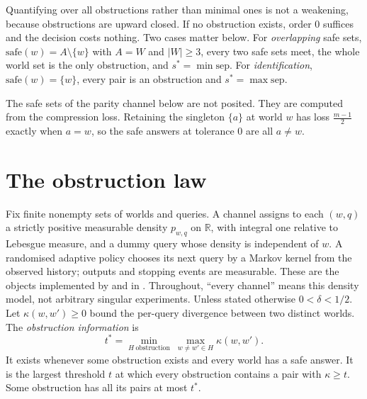 
Quantifying over all obstructions rather than minimal ones is not a weakening, because
obstructions are upward closed. If no obstruction exists, order $0$ suffices and the decision
costs nothing. Two cases matter below. For \emph{overlapping} safe sets,
$\mathrm{safe}(w)=A\setminus\{w\}$ with $A=W$ and $|W|\ge3$, every two safe sets meet, the whole world set is
the only obstruction, and $s^{*}=\min\mathrm{sep}$. For \emph{identification},
$\mathrm{safe}(w)=\{w\}$, every pair is an obstruction and $s^{*}=\max\mathrm{sep}$.


The safe sets of the parity channel below are not posited. They are computed from the
compression loss. Retaining the singleton $\{a\}$ at world $w$ has loss $\frac{m-1}{2}$ exactly
when $a=w$, so the safe answers at tolerance $0$ are all $a\ne w$.


\section{The obstruction law}
\label{sec:law}

Fix finite nonempty sets of worlds and queries. A channel assigns to each $(w,q)$ a
strictly positive measurable density $p_{w,q}$ on $\mathbb R$, with integral one relative
to Lebesgue measure, and a dummy query whose density is independent of $w$.
A randomised adaptive policy chooses its next query by a Markov kernel from the observed
history; outputs and stopping events are measurable. These are the objects implemented by
 and  in .
Throughout, ``every channel'' means this density model, not arbitrary singular experiments.
Unless stated otherwise $0<\delta<1/2$. Let $\kappa(w,w')\ge0$ bound the per-query divergence
between two distinct worlds. The
\emph{obstruction information} is
\[
t^{*}=\min_{H\ \text{obstruction}}\ \max_{w\ne w'\in H}\kappa(w,w').
\]
It exists whenever some obstruction exists and every world has a safe answer. It is the largest
threshold $t$ at which every obstruction contains a pair with $\kappa\ge t$. Some obstruction
has all its pairs at most $t^{*}$.

